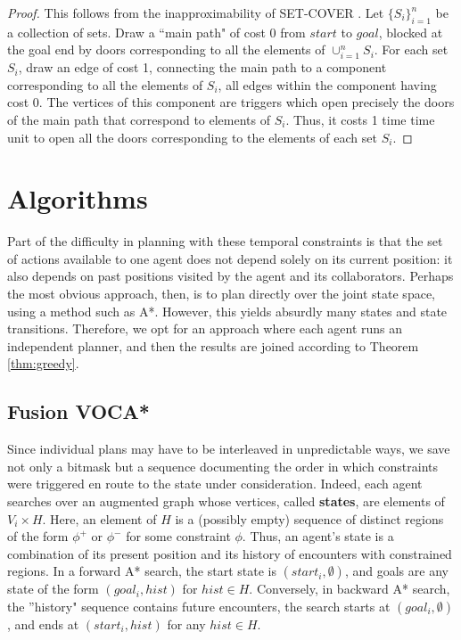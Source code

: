 \documentclass[letterpaper]{article}
\begin{document}
\begin{proof}
This follows from the inapproximability of SET-COVER \cite{moshkovitz2012projection}. Let $\{S_i\}_{i=1}^n$ be a collection of sets. Draw a ``main path" of cost 0 from $start$ to $goal$, blocked at the goal end by doors corresponding to all the elements of $\cup_{i=1}^n S_i$. For each set $S_i$, draw an edge of cost 1, connecting the main path to a component corresponding to all the elements of $S_i$, all edges within the component having cost 0. The vertices of this component are triggers which open precisely the doors of the main path that correspond to elements of $S_i$. Thus, it costs 1 time time unit to open all the doors corresponding to the elements of each set $S_i$.
\end{proof}

\section{Algorithms}

Part of the difficulty in planning with these temporal constraints is that the set of actions available to one agent does not depend solely on its current position: it also depends on past positions visited by the agent and its collaborators. Perhaps the most obvious approach, then, is to plan directly over the joint state space, using a method such as A*. However, this yields absurdly many states and state transitions. Therefore, we opt for an approach where each agent runs an independent planner, and then the results are joined according to Theorem \ref{thm:greedy}.

\subsection{Fusion VOCA*}

Since individual plans may have to be interleaved in unpredictable ways, we save not only a bitmask but a sequence documenting the order in which constraints were triggered en route to the state under consideration. Indeed, each agent searches over an augmented graph whose vertices, called \textbf{states}, are elements of $V_i \times H$. Here, an element of $H$ is a (possibly empty) sequence of distinct regions of the form $\phi^+$ or $\phi^-$ for some constraint $\phi$. Thus, an agent's state is a combination of its present position and its history of encounters with constrained regions. In a forward A* search, the start state is $(start_i, \emptyset)$, and goals are any state of the form $(goal_i, hist)$ for $hist\in H$. Conversely, in backward A* search, the ''history" sequence contains future encounters, the search starts at $(goal_i, \emptyset)$, and ends at $(start_i, hist)$ for any $hist\in H$.
\end{document}
